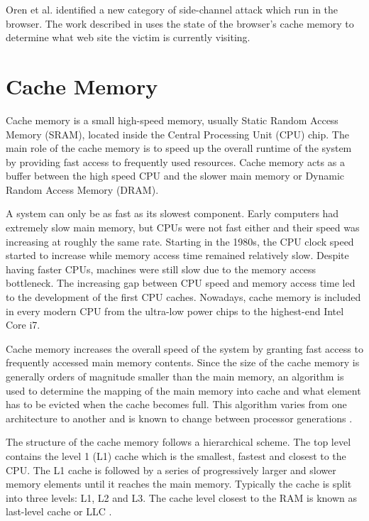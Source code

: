 \documentclass[10pt,a4paper,twoside]{book}
\begin{document}
Oren et al. \cite{oren2015spy} identified a new category of side-channel attack which run in the browser. The work described in \cite{oren2015spy} uses the state of the browser's cache memory to determine what web site the victim is currently visiting.

\section{Cache Memory}

Cache memory is a small high-speed memory, usually Static Random Access Memory (SRAM), located inside the Central Processing Unit (CPU) chip. The main role of the cache memory is to speed up the overall runtime of the system by providing fast access to frequently used resources. Cache memory acts as a buffer between the high speed CPU and the slower main memory or Dynamic Random Access Memory (DRAM).

A system can only be as fast as its slowest component. Early computers had extremely slow main memory, but CPUs were not fast either and their speed was increasing at roughly the same rate. Starting in the 1980s, the CPU clock speed started to increase while memory access time remained relatively slow. Despite having faster CPUs, machines were still slow due to the memory access bottleneck. The increasing gap between CPU speed and memory access time led to the development of the first CPU caches. Nowadays, cache memory is included in every modern CPU from the ultra-low power chips to the highest-end Intel Core i7.

Cache memory increases the overall speed of the system by granting fast access to frequently accessed main memory contents. Since the size of the cache memory is generally orders of magnitude smaller than the main memory, an algorithm is used to determine the mapping of the main memory into cache and what element has to be evicted when the cache becomes full. This algorithm varies from one architecture to another and is known to change between processor generations \cite{oren2015spy}. 

The structure of the cache memory follows a hierarchical scheme. The top level contains the level 1 (L1) cache which is the smallest, fastest and closest to the CPU. The L1 cache is followed by a series of progressively larger and slower memory elements until it reaches the main memory. Typically the cache is split into three levels: L1, L2 and L3. The cache level closest to the RAM is known as last-level cache or LLC \cite{oren2015spy}.
\end{document}

